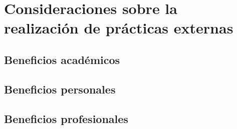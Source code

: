 \chapter{Consideraciones sobre la realización de prácticas externas}
\label{sec:consideraciones}

\section{Beneficios académicos}
\label{subsec:ben-academic}

\section{Beneficios personales}
\label{subsec:ben-pers}

\section{Beneficios profesionales}
\label{subsec:ben-prof}
